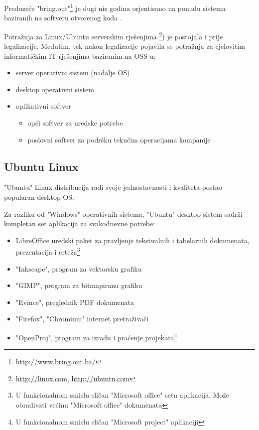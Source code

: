 \documentclass[times, utf8, seminar]{fit}
\begin{document}
Preduzeće "bring.out"\footnote{\url{http://www.bring.out.ba/}} je dugi niz godina orjentisano na ponudu sistema baziranih na softveru otvorenog koda .

Potražnja za Linux/Ubuntu serverskim rješenjima \footnote{\url{http://linux.com}, \url{http://ubuntu.com}}) je postojala i prije legalizacije. Međutim, tek nakon legalizacije pojavila se potražnja za cjelovitim informatičkim IT rješenjima baziranim na OSS-u:
\begin{itemize}
  \item server operativni sistem (nadalje OS)
  \item desktop operativni sistem
  \item aplikativni softver
  \begin{itemize}
    \item opći softver za uredske potrebe
    \item poslovni softver za podršku tekućim operacijama kompanije 
  \end{itemize}
\end{itemize}

\subsection{Ubuntu Linux}
"Ubuntu" Linux distribucija radi svoje jednostavnosti i kvaliteta postao popularan desktop OS.

Za razliku od "Windows" operativnih sistema, "Ubuntu" desktop sistem sadrži kompletan set aplikacija za svakodnevne potrebe:
\begin{itemize}
  \item LibreOffice uredski paket za pravljenje tekstualnih i tabelarnih dokumenata, prezentacija i crteža\footnote{U funkcionalnom smislu sličan "Microsoft office" setu aplikacija. Može obrađivati većinu "Microsoft office" dokumenata}
  \item "Inkscape", program za vektorsku grafiku \cite{inkscape}
  \item "GIMP", program za bitmapiranu grafiku
  \item "Evince", preglednik PDF dokumenata
  \item "Firefox", "Chromium" internet pretraživači
  \item "OpenProj", program za izradu i praćenje projekata\footnote{U funkcionalnom smislu sličan "Microsoft project" aplikaciji}
\end{itemize}  
\end{document}

